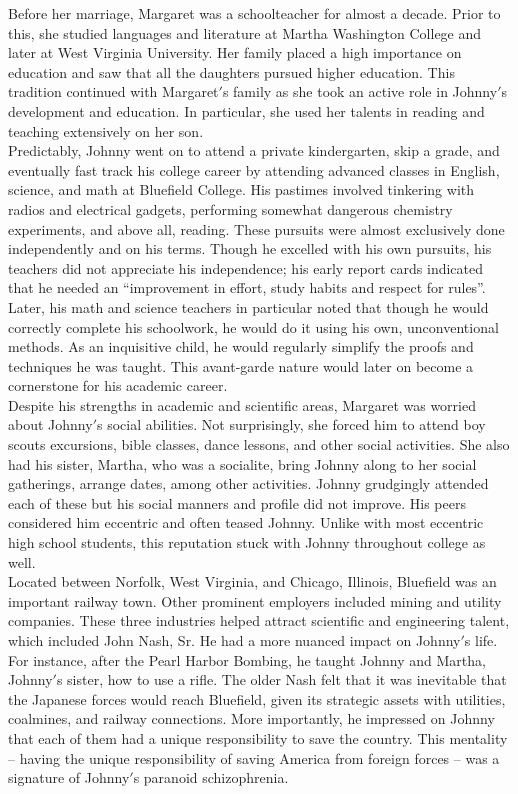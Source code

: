 \documentclass[12pt]{article}
\begin{document}
Before her marriage, Margaret was a schoolteacher for almost a decade. Prior to this, she studied languages and literature at Martha Washington College and later at West Virginia University. Her family placed a high importance on education and saw that all the daughters pursued higher education. This tradition continued with Margaret$'$s family as she took an active role in Johnny$'$s development and education. In particular, she used her talents in reading and teaching extensively on her son.\\

Predictably, Johnny went on to attend a private kindergarten, skip a grade, and eventually fast track his college career by attending advanced classes in English, science, and math at  Bluefield College. His pastimes involved tinkering with radios and electrical gadgets, performing somewhat dangerous chemistry experiments, and above all, reading. These pursuits were almost exclusively done independently and on his terms. Though he excelled with his own pursuits, his teachers did not appreciate his independence; his early report cards indicated that he needed an ``improvement in effort, study habits and respect for rules''\cite{24}. Later, his math and science teachers in particular noted that though he would correctly complete his schoolwork, he would do it using his own, unconventional methods. As an inquisitive child, he would regularly simplify the proofs and techniques he was taught. This avant-garde nature would later on become a cornerstone for his academic career.\\

Despite his strengths in academic and scientific areas, Margaret was worried about Johnny$'$s social abilities. Not surprisingly, she forced him to attend boy scouts excursions, bible classes, dance lessons, and other social activities. She also had his sister, Martha, who was a socialite, bring Johnny along to her social gatherings, arrange dates, among other activities. Johnny grudgingly attended each of these but his social manners and profile did not improve. His peers considered him eccentric and often teased Johnny. Unlike with most eccentric high school students, this reputation stuck with Johnny throughout college as well.\\

Located between Norfolk, West Virginia, and Chicago, Illinois, Bluefield was an important railway town. Other prominent employers included mining and utility companies. These three industries helped attract scientific and engineering talent, which included John Nash, Sr. He had a more nuanced impact on Johnny$'$s life. For instance, after the Pearl Harbor Bombing, he taught Johnny and Martha, Johnny$'$s sister, how to use a rifle. The older Nash felt that it was inevitable that the Japanese forces would reach Bluefield, given its strategic assets with utilities, coalmines, and railway connections. More importantly, he impressed on Johnny that each of them had a unique responsibility to save the country. This mentality – having the unique responsibility of saving America from foreign forces -- was a signature of Johnny$'$s paranoid schizophrenia.
\end{document}
